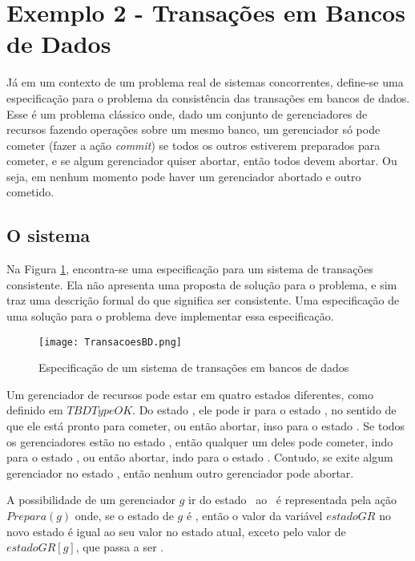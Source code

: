\section{Exemplo 2 - Transações em Bancos de Dados}

Já em um contexto de um problema real de sistemas concorrentes, define-se uma especificação para o problema da consistência das transações em bancos de dados. Esse é um problema clássico onde, dado um conjunto de gerenciadores de recursos fazendo operações sobre um mesmo banco, um gerenciador só pode cometer (fazer a ação \textit{commit}) se todos os outros estiverem preparados para cometer, e se algum gerenciador quiser abortar, então todos devem abortar. Ou seja, em nenhum momento pode haver um gerenciador abortado e outro cometido.

\subsection{O sistema}

Na Figura \ref{fig:ex2tla}, encontra-se uma especificação para um sistema de transações consistente. Ela não apresenta uma proposta de solução para o problema, e sim traz uma descrição formal do que significa ser consistente. Uma especificação de uma solução para o problema deve implementar essa especificação.

\begin{figure}[h]
  \centering
  \texttt{[image: TransacoesBD.png]}
  \caption{Especificação de um sistema de transações em bancos de dados}
\label{fig:ex2tla}
\end{figure}

Um gerenciador de recursos pode estar em quatro estados diferentes, como definido em $TBDTypeOK$. Do estado \trabalhando, ele pode ir para o estado \preparado, no sentido de que ele está pronto para cometer, ou então abortar, inso para o estado \abortado. Se todos os gerenciadores estão no estado \preparado, então qualquer um deles pode cometer, indo para o estado \cometido, ou então abortar, indo para o estado \abortado. Contudo, se exite algum gerenciador no estado \cometido, então nenhum outro gerenciador pode abortar.

A possibilidade de um gerenciador $g$ ir do estado \trabalhando\ ao \preparado\ é representada pela ação $Prepara(g)$ onde, se o estado de $g$ é \trabalhando, então o valor da variável $estadoGR$ no novo estado é igual ao seu valor no estado atual, exceto pelo valor de $estadoGR[g]$, que passa a ser \preparado.

